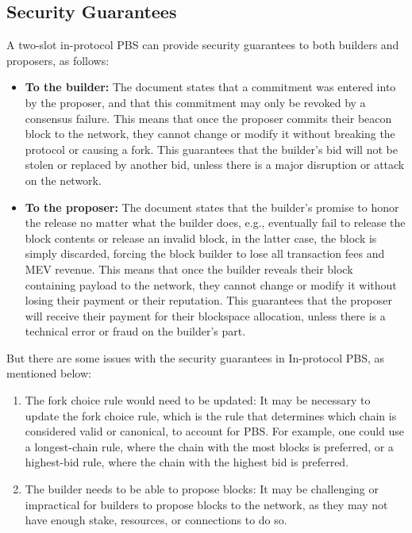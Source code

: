 \documentclass{report}
\begin{document}
\subsection{Security Guarantees}
A two-slot in-protocol PBS can provide security guarantees to both builders and proposers, as follows:
\begin{itemize}
	\item \textbf{To the builder:} The document states that a commitment was entered into by the proposer, and that this commitment may only be revoked by a consensus failure. This means that once the proposer commits their beacon block to the network, they cannot change or modify it without breaking the protocol or causing a fork. This guarantees that the builder’s bid will not be stolen or replaced by another bid, unless there is a major disruption or attack on the network.
	\item \textbf{To the proposer:} The document states that the builder’s promise to honor the release no matter what the builder does, e.g., eventually fail to release the block contents or release an invalid block, in the latter case, the block is simply discarded, forcing the block builder to lose all transaction fees and MEV revenue. This means that once the builder reveals their block containing payload to the network, they cannot change or modify it without losing their payment or their reputation. This guarantees that the proposer will receive their payment for their blockspace allocation, unless there is a technical error or fraud on the builder’s part.
\end{itemize}
But there are some issues with the security guarantees in In-protocol PBS, as mentioned below:
\begin{enumerate}
	\item The fork choice rule would need to be updated: It may be necessary to update the fork choice rule, which is the rule that determines which chain is considered valid or canonical, to account for PBS. For example, one could use a longest-chain rule, where the chain with the most blocks is preferred, or a highest-bid rule, where the chain with the highest bid is preferred.
	\item The builder needs to be able to propose blocks: It may be challenging or impractical for builders to propose blocks to the network, as they may not have enough stake, resources, or connections to do so.
\end{enumerate}
\end{document}
